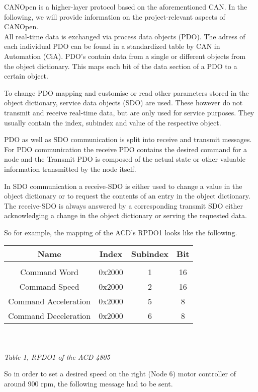 CANOpen is a higher-layer protocol based on the aforementioned CAN. In the following, we will provide information on the project-relevant aspects of CANOpen.
\\
All real-time data is exchanged via process data objects (PDO). The adress of each individual PDO can be found in a standardized table by CAN in Automation (CiA). PDO's contain data from a single or different objects from the object dictionary. This maps each bit of the data section of a PDO to a certain object.

To change PDO mapping and customise or read other parameters stored in the object dictionary, service data objects (SDO) are used. These however do not transmit and receive real-time data, but are only used for service purposes. They usually contain the index, subindex and value of the respective object.

PDO as well as SDO communication is split into receive and transmit messages.
 For PDO communication the receive PDO contains the desired command for a node and the Transmit PDO is composed of the actual state or other valuable information transmitted by the node itself.

In SDO communication a receive-SDO is either used to change a value in the object dictionary or to request the contents of an entry in the object dictionary. The receive-SDO is always answered by a corresponding transmit SDO either acknowledging a change in the object dictionary or serving the requested data.

So for example, the mapping of the ACD's RPDO1 looks like the following.

\begin{tabular}{|c|c|c|c|}
	\hline 
	Name & Index & Subindex & Bit \\ 
	\hline 
	&  &  &  \\ 
	\hline 
	Command Word & 0x2000 & 1 & 16 \\ 
	\hline 
	Command Speed & 0x2000 & 2 & 16 \\ 
	\hline 
	Command Acceleration & 0x2000 & 5 & 8 \\ 
	\hline 
	Command Deceleration & 0x2000 & 6 & 8 \\ 
	\hline 
\end{tabular} 
\\
\\
\textit{Table 1, RPDO1 of the ACD 4805}

So in order to set a desired speed on the right (Node 6) motor controller of around 900 rpm, the following message had to be sent.

